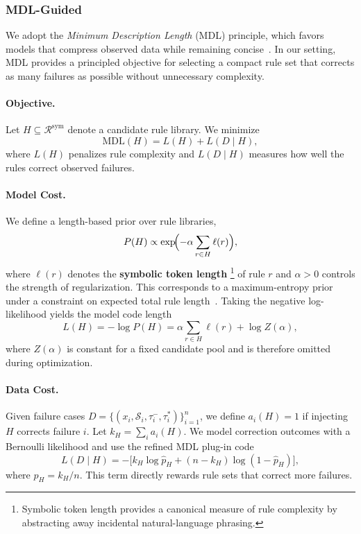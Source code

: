 \subsubsection{MDL-Guided}
\label{sec:mdl}

We adopt the \emph{Minimum
Description Length} (MDL) principle, which favors models that compress observed data while
remaining concise~\citep{rissanen1978modeling,Grunwald07MDL}. In our setting, MDL provides
a principled objective for selecting a compact rule set that corrects as many failures as
possible without unnecessary complexity.

\paragraph{Objective.}
Let \( H \subseteq \mathcal{R}^{\text{sym}} \) denote a candidate rule library. We minimize
\[
\mathrm{MDL}(H) = L(H) + L(D \mid H),
\]
where \( L(H) \) penalizes rule complexity and \( L(D \mid H) \) measures how well the rules
correct observed failures.

\paragraph{Model Cost.}
We define a length-based prior over rule libraries,
\[
P(H) \propto \exp\!\Bigl(-\alpha \sum_{r \in H} \ell(r)\Bigr),
\]
where \( \ell(r) \) denotes the \textbf{symbolic token length}
\footnote{Symbolic token length provides a canonical measure of rule complexity by
abstracting away incidental natural-language phrasing.}
of rule \( r \) and \( \alpha > 0 \)
controls the strength of regularization. This corresponds to a maximum-entropy prior under
a constraint on expected total rule length~\citep{jaynes1957maxent}. Taking the negative
log-likelihood yields the model code length
\[
L(H) = -\log P(H) = \alpha \sum_{r \in H} \ell(r) + \log Z(\alpha),
\]
where \( Z(\alpha) \) is constant for a fixed candidate pool and is therefore omitted during
optimization.

\paragraph{Data Cost.}
Given failure cases \( D = \{(x_i, \mathcal{S}_i, \tau_i^-, \tau_i^*)\}_{i=1}^n \), we define
\( a_i(H) = 1 \) if injecting \( H \) corrects failure \( i \). Let
\( k_H = \sum_i a_i(H) \). We model correction outcomes with a Bernoulli likelihood and
use the refined MDL plug-in code
\[
L(D \mid H) = -\bigl[k_H \log \hat{p}_H + (n-k_H)\log(1-\hat{p}_H)\bigr],
\]
where \( \hat{p}_H = k_H/n \). This term directly rewards rule sets that correct more failures.


